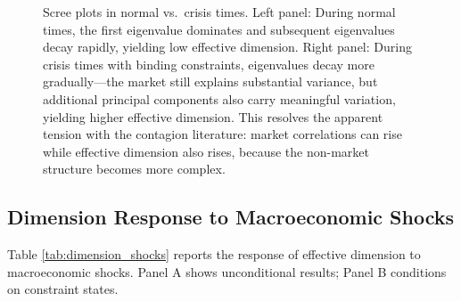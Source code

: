 \documentclass[12pt,letterpaper]{article}
\theoremstyle{plain}
\theoremstyle{definition}
\newcommand{\deff}{d_{\text{eff}}}
\begin{document}
\begin{figure}[htbp]
\caption{Scree plots in normal vs.\ crisis times. Left panel: During normal times, the first eigenvalue dominates and subsequent eigenvalues decay rapidly, yielding low effective dimension. Right panel: During crisis times with binding constraints, eigenvalues decay more gradually---the market still explains substantial variance, but additional principal components also carry meaningful variation, yielding higher effective dimension. This resolves the apparent tension with the contagion literature: market correlations can rise while effective dimension also rises, because the non-market structure becomes more complex.}
\label{fig:scree_comparison}
\end{figure}

\subsection{Dimension Response to Macroeconomic Shocks}\label{subsec:dim_shocks}

Table \ref{tab:dimension_shocks} reports the response of effective dimension to macroeconomic shocks. Panel A shows unconditional results; Panel B conditions on constraint states.
\end{document}
